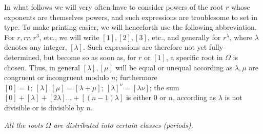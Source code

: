 In what follows we will very often have to consider powers of the root \(r\) whose exponents are themselves powers, and such expressions are troublesome to set in type. To make printing easier, we will henceforth
use the following abbreviation. For \(r,\allowbreak rr,\allowbreak r^3\), etc., we will write \([1],\allowbreak [2],\allowbreak [3]\), etc., and generally for \(r^\lambda\), where \(\lambda\) denotes any integer, \([\lambda]\). Such expressions are therefore not yet fully determined, but become so as soon as, for \(r\) or \([1]\), a specific root in \(\Omega\) is chosen. Thus, in general \([\lambda],\allowbreak [\mu]\) will be equal or unequal according as \(\lambda,\allowbreak \mu\) are congruent or incongruent modulo \(n\); furthermore \([0]=1;\allowbreak \ [\lambda].[\mu]=[\lambda+\mu];\allowbreak \ [\lambda]^\nu=[\lambda\nu]\); the sum \([0]+[\lambda]+[2\lambda]\ldots+[(n-1)\lambda]\) is either \(0\) or \(n\), according as \(\lambda\) is not divisible or is divisible by \(n\).

\begin{center}\textit{All the roots \(\Omega\) are distributed into certain classes (periods).}\end{center}



